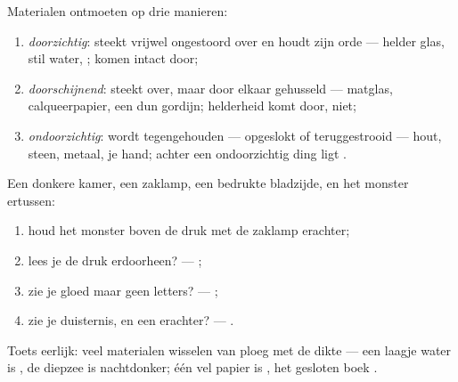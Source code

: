 \begin{definition}\label{def:g7:light-sources-propagation:coats}
Materialen ontmoeten  op drie manieren:
\begin{enumerate}
  \item \emph{doorzichtig}:  steekt vrijwel
        ongestoord over en houdt zijn orde --- helder glas, stil
        water, ;  komen intact door;
  \item \emph{doorschijnend}:  steekt
        over, maar door elkaar gehusseld --- matglas, calqueerpapier,
        een dun gordijn; helderheid komt door,  niet;
  \item \emph{ondoorzichtig}:  wordt
        tegengehouden --- opgeslokt of teruggestrooid --- hout,
        steen, metaal, je hand; achter een ondoorzichtig ding ligt
        .
\end{enumerate}
\end{definition}

\begin{method}\label{met:g7:light-sources-propagation:sort}
Een donkere kamer, een zaklamp, een bedrukte bladzijde, en het monster
ertussen:
\begin{enumerate}
  \item houd het monster boven de druk met de zaklamp erachter;
  \item lees je de druk erdoorheen? --- ;
  \item zie je gloed maar geen letters? --- ;
  \item zie je duisternis, en een  erachter? ---
        .
\end{enumerate}
Toets eerlijk: veel materialen wisselen van ploeg met de dikte --- een
laagje water is , de diepzee is nachtdonker; één vel
papier is , het gesloten boek .
\end{method}

